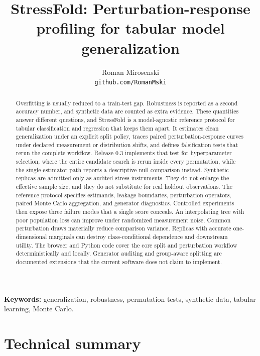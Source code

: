 \documentclass[10pt,twocolumn]{article}
\title{\textbf{StressFold: Perturbation-response profiling for tabular model generalization}}
\author{Roman Mirosenski\\[2pt]\small\texttt{github.com/RomanMski}}
\date{}
\begin{document}
\maketitle

\begin{abstract}
Overfitting is usually reduced to a train-test gap. Robustness is reported as a second accuracy number, and synthetic data are counted as extra evidence. These quantities answer different questions, and StressFold is a model-agnostic reference protocol for tabular classification and regression that keeps them apart. It estimates clean generalization under an explicit split policy, traces paired perturbation-response curves under declared measurement or distribution shifts, and defines falsification tests that rerun the complete workflow. Release 0.3 implements that test for hyperparameter selection, where the entire candidate search is rerun inside every permutation, while the single-estimator path reports a descriptive null comparison instead. Synthetic replicas are admitted only as audited stress instruments. They do not enlarge the effective sample size, and they do not substitute for real holdout observations. The reference protocol specifies estimands, leakage boundaries, perturbation operators, paired Monte Carlo aggregation, and generator diagnostics. Controlled experiments then expose three failure modes that a single score conceals. An interpolating tree with poor population loss can improve under randomized measurement noise. Common perturbation draws materially reduce comparison variance. Replicas with accurate one-dimensional marginals can destroy class-conditional dependence and downstream utility. The browser and Python code cover the core split and perturbation workflow deterministically and locally. Generator auditing and group-aware splitting are documented extensions that the current software does not claim to implement.
\end{abstract}

\noindent\textbf{Keywords:} generalization, robustness, permutation tests, synthetic data, tabular learning, Monte Carlo.

\section{Technical summary}
\end{document}
